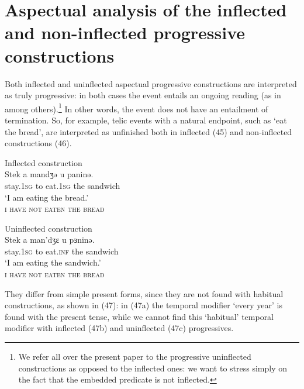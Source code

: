 \documentclass[output=paper]{langsci/langscibook}
\begin{document}
\section{Aspectual analysis of the inflected and non-inflected progressive constructions}%
Both inflected and uninflected aspectual progressive constructions are interpreted as truly progressive: in both cases the event entails an ongoing reading (as in \citealt{Arosio2011} among others).\footnote{We refer all over the present paper to the progressive uninflected constructions as opposed to the inflected ones: we want to stress simply on the fact that the embedded predicate is not inflected.} In other words, the event does not have an entailment of termination. So, for example, telic events with a natural endpoint, such as ‘eat the bread’, are interpreted as unfinished both in inflected (45) and non-inflected constructions (46). 

\ea%
         Inflected construction\label{ex:lorusso:45}\\
    \gll Stek     a  mandʒə   u  paninə. \\
         stay.\textsc{1sg} to  eat.\textsc{1sg} the   sandwich \\
    \glt ‘I am eating the bread.’\\\textsc{i have not eaten the bread}
\z



\ea%
         Uninflected construction\label{ex:lorusso:46}\\
    \gll Stek     a  man’dʒɛ  u  pɜninə.     \\
         stay.\textsc{1sg} to  eat.\textsc{inf} the   sandwich \\
    \glt ‘I am eating the sandwich.’\\\textsc{i have not eaten the bread}
\z 

They differ from simple present forms, since they are not found with habitual constructions, as shown in (47): in (47a) the temporal modifier ‘every year’ is found with the present tense, while we cannot find this ‘habitual’ temporal modifier with inflected (47b) and uninflected (47c) progressives.

\ea%
    \label{ex:lorusso:47}
    \z
\z
\end{document}
